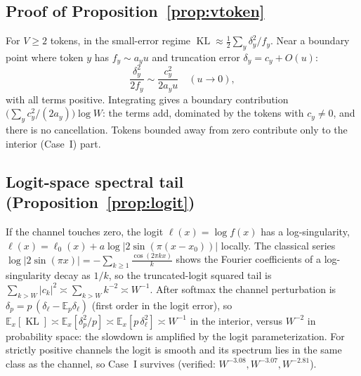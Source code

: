 \documentclass[12pt]{article}
\newcommand{\KL}{\operatorname{KL}}
\newcommand{\E}{\mathbb{E}}
\theoremstyle{remark}
\begin{document}
\subsection{Proof of Proposition~\ref{prop:vtoken}}
\label{app:vtoken}
For $V\ge2$ tokens, in the small-error regime
$\KL\approx\frac12\sum_y\delta_y^2/f_y$. Near a boundary point where token
$y$ has $f_y\sim a_y u$ and truncation error $\delta_y=c_y+O(u)$:
\begin{equation*}
  \frac{\delta_y^2}{2f_y}\sim\frac{c_y^2}{2a_y u}\quad(u\to0),
\end{equation*}
with all terms positive. Integrating gives a boundary contribution
$\bigl(\sum_y c_y^2/(2a_y)\bigr)\log W$: the terms add, dominated by the
tokens with $c_y\ne0$, and there is no cancellation. Tokens bounded away from
zero contribute only to the interior (Case~I) part.

\subsection{Logit-space spectral tail (Proposition~\ref{prop:logit})}
\label{app:logit}
If the channel touches zero, the logit $\ell(x)=\log f(x)$ has a
log-singularity, $\ell(x)=\ell_0(x)+a\log|2\sin(\pi(x-x_0))|$ locally. The
classical series $\log|2\sin(\pi x)|=-\sum_{k\ge1}\frac{\cos(2\pi kx)}{k}$
shows the Fourier coefficients of a log-singularity decay as $1/k$, so the
truncated-logit squared tail is
$\sum_{k>W}|c_k|^2\asymp\sum_{k>W}k^{-2}\asymp W^{-1}$. After softmax the
channel perturbation is $\delta_p=p\,(\delta_\ell-\E_p\delta_\ell)$ (first
order in the logit error), so
$\E_x[\KL]\asymp\E_x[\delta_p^2/p]\asymp\E_x[p\,\delta_\ell^2]\asymp
W^{-1}$ in the interior, versus $W^{-2}$ in probability space: the slowdown
is amplified by the logit parameterization. For strictly positive channels
the logit is smooth and its spectrum lies in the same class as the channel,
so Case~I survives (verified: $W^{-3.08},W^{-3.07},W^{-2.81}$).
\end{document}
